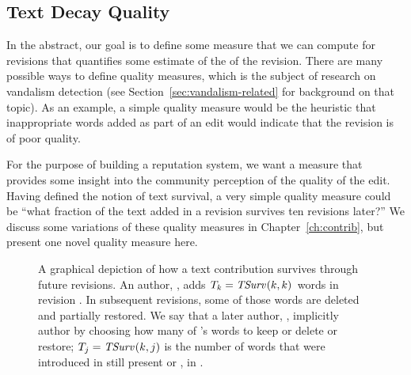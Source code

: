 \subsection{Text Decay Quality}

In the abstract, our goal is to define some measure that we can compute for
revisions that quantifies some estimate of the  of the
revision.
There are many possible ways to define quality measures, which is the
subject of research on vandalism detection (see
Section~\ref{sec:vandalism-related} for background on that topic).
As an example, a simple quality measure would be the heuristic that
inappropriate words added as part of an edit would indicate that the revision
is of poor quality.

For the purpose of building a reputation system, we want a measure
that provides some insight into the community perception of the
quality of the edit.
Having defined the notion of text survival, a very simple quality measure
could be ``what fraction of the text added in a revision survives
ten revisions later?''
We discuss some variations of these quality measures in
Chapter~\ref{ch:contrib}, but present one novel quality measure here.

\begin{figure}[htbp]
\centering
{}
\caption[Depiction of how a text contribution survives through future
        revisions]{A graphical depiction of how a text contribution survives
	through future revisions.
        An author, , adds
    $T_k = \mathit{TSurv}_{}(k,k)$ words in revision .  In subsequent
    revisions, some of those words are deleted and partially restored.
    We say that a later author, , implicitly 
    author  by choosing how many of 's words
    to keep or delete or restore; $T_j = \mathit{TSurv}_{}(k,j)$ is the number of words
    that were introduced in  still present or
    , in .
}
\label{fig:textsurvival}
\end{figure}


